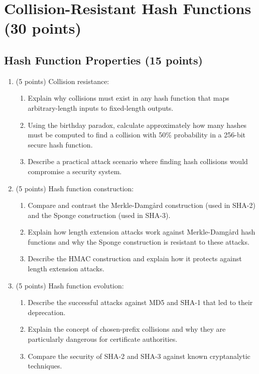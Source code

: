 \documentclass[10pt,a4paper,american]{exam}
\begin{document}
\section{Collision-Resistant Hash Functions (30 points)}

\subsection{Hash Function Properties (15 points)}

\begin{enumerate}
	\item (5 points) Collision resistance:
	      \begin{enumerate}
		      \item Explain why collisions must exist in any hash function that maps arbitrary-length inputs to fixed-length outputs.
		      \item Using the birthday paradox, calculate approximately how many hashes must be computed to find a collision with 50\% probability in a 256-bit secure hash function.
		      \item Describe a practical attack scenario where finding hash collisions would compromise a security system.
	      \end{enumerate}

	\item (5 points) Hash function construction:
	      \begin{enumerate}
		      \item Compare and contrast the Merkle-Damgård construction (used in SHA-2) and the Sponge construction (used in SHA-3).
		      \item Explain how length extension attacks work against Merkle-Damgård hash functions and why the Sponge construction is resistant to these attacks.
		      \item Describe the HMAC construction and explain how it protects against length extension attacks.
	      \end{enumerate}

	\item (5 points) Hash function evolution:
	      \begin{enumerate}
		      \item Describe the successful attacks against MD5 and SHA-1 that led to their deprecation.
		      \item Explain the concept of chosen-prefix collisions and why they are particularly dangerous for certificate authorities.
		      \item Compare the security of SHA-2 and SHA-3 against known cryptanalytic techniques.
	      \end{enumerate}
\end{enumerate}
\end{document}
